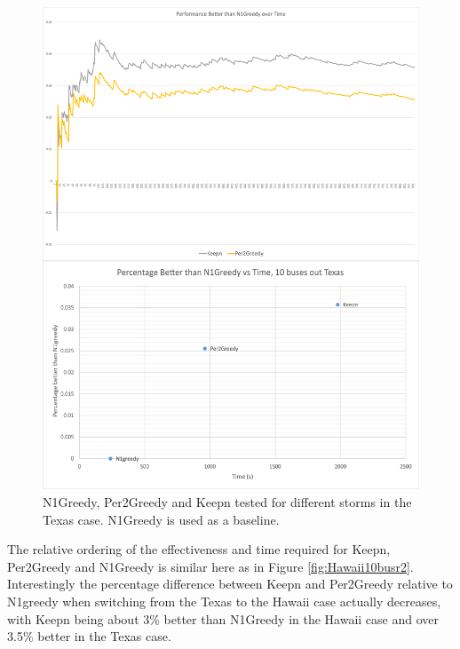 \documentclass[12pt]{article}
\begin{document}
\begin{figure}[ht]
    \centering %
    \includegraphics[scale = 0.24]{Texas10busr2.pdf}
    \caption[Second Testing Set - 10 buses removed, Texas Case]{N1Greedy, Per2Greedy and Keepn tested for different storms in the Texas case. N1Greedy is used as a baseline.}
    \label{fig:Texas10busr2}
\end{figure}

The relative ordering of the effectiveness and time required for Keepn, Per2Greedy and N1Greedy is similar here as in Figure \ref{fig:Hawaii10busr2}. Interestingly the percentage difference between Keepn and Per2Greedy relative to N1greedy when switching from the Texas to the Hawaii case actually decreases, with Keepn being about 3\% better than N1Greedy in the Hawaii case and over 3.5\% better in the Texas case. \par
\end{document}
